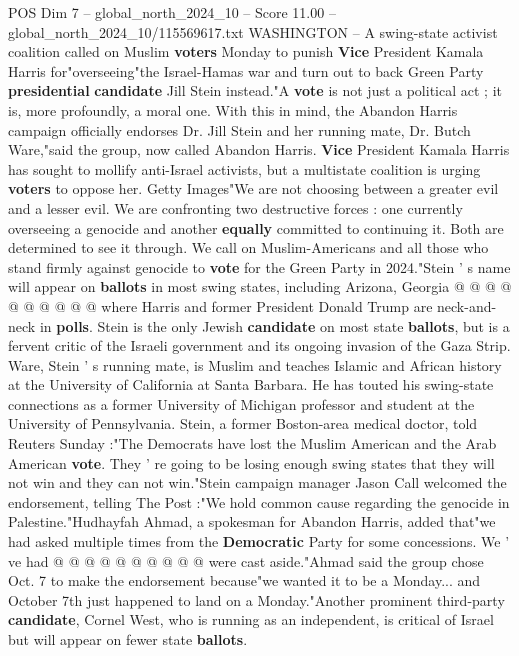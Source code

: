 \begin{textsample}{POS Dim 7 – global\_north\_2024\_10 – Score 11.00 – global\_north\_2024\_10/115569617.txt}  \label{ex:f7_pos_097}
WASHINGTON -- A swing-state activist coalition called on Muslim \textbf{voters} Monday to punish \textbf{Vice} President Kamala Harris for"overseeing"the Israel-Hamas war and turn out to back Green Party \textbf{presidential} \textbf{candidate} Jill Stein instead."A \textbf{vote} is not just a political act ; it is, more profoundly, a moral one.
With this in mind, the Abandon Harris campaign officially endorses Dr.
Jill Stein and her running mate, Dr.
Butch Ware,"said the group, now called Abandon Harris. \textbf{Vice} President Kamala Harris has sought to mollify anti-Israel activists, but a multistate coalition is urging \textbf{voters} to oppose her.
Getty Images"We are not choosing between a greater evil and a lesser evil.
We are confronting two destructive forces : one currently overseeing a genocide and another \textbf{equally} committed to continuing it.
Both are determined to see it through.
We call on Muslim-Americans and all those who stand firmly against genocide to \textbf{vote} for the Green Party in 2024."Stein ' s name will appear on \textbf{ballots} in most swing states, including Arizona, Georgia @ @ @ @ @ @ @ @ @ @ where Harris and former President Donald Trump are neck-and-neck in \textbf{polls}.
Stein is the only Jewish \textbf{candidate} on most state \textbf{ballots}, but is a fervent critic of the Israeli government and its ongoing invasion of the Gaza Strip.
Ware, Stein ' s running mate, is Muslim and teaches Islamic and African history at the University of California at Santa Barbara.
He has touted his swing-state connections as a former University of Michigan professor and student at the University of Pennsylvania.
Stein, a former Boston-area medical doctor, told Reuters Sunday :"The Democrats have lost the Muslim American and the Arab American \textbf{vote}.
They ' re going to be losing enough swing states that they will not win and they can not win."Stein campaign manager Jason Call welcomed the endorsement, telling The Post :"We hold common cause regarding the genocide in Palestine."Hudhayfah Ahmad, a spokesman for Abandon Harris, added that"we had asked multiple times from the \textbf{Democratic} Party for some concessions.
We ' ve had @ @ @ @ @ @ @ @ @ @ were cast aside."Ahmad said the group chose Oct. 7 to make the endorsement because"we wanted it to be a Monday... and October 7th just happened to land on a Monday."Another prominent third-party \textbf{candidate}, Cornel West, who is running as an independent, is critical of Israel but will appear on fewer state \textbf{ballots}.

\end{textsample}
